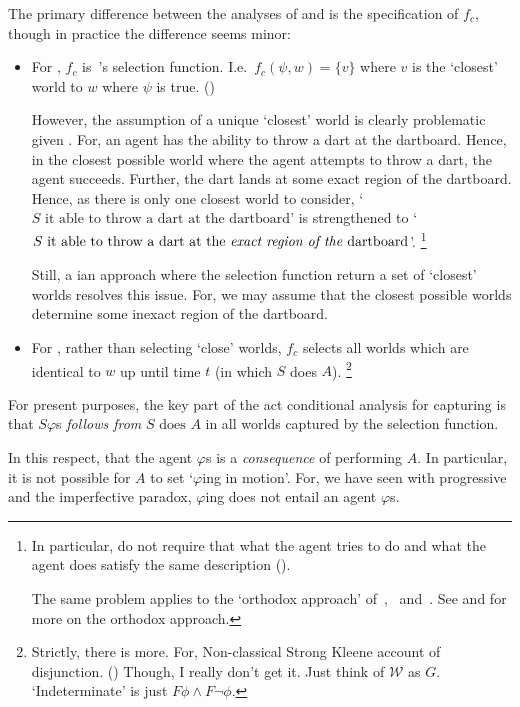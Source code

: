 \begin{note}
  The primary difference between the analyses of \citeauthor{Mandelkern:2017aa} and \citeauthor{Boylan:2020aa} is the specification of \(f_{c}\), though in practice the difference seems minor:
  \begin{itemize}
  \item
    For \citeauthor{Mandelkern:2017aa},
    \(f_{c}\) is~\citeauthor{Stalnaker:1968vt}'s selection function.
    I.e.\ \(f_{c}(\psi, w) = \{v\}\) where \(v\) is the `closest' world to \(w\) where \(\psi\) is true.
    (\citeyear[Cf.][314]{Mandelkern:2017aa})

    However, the assumption of a unique `closest' world is clearly problematic given \BoyVS{}.
    For, an agent has the ability to throw a dart at the dartboard.
    Hence, in the closest possible world where the agent attempts to throw a dart, the agent succeeds.
    Further, the dart lands at some exact region of the dartboard.
    Hence, as there is only one closest world to consider, `\(S\text{ it able to throw a dart at the dartboard}\)' is strengthened to `\(S\text{ it able to throw a dart at the \emph{exact region of the} dartboard}\)'.%
    \footnote{
      In particular, \citeauthor{Mandelkern:2017aa} do not require that what the agent tries to do and what the agent does satisfy the same description (\citeyear[310,314]{Mandelkern:2017aa}).

      The same problem applies to the `orthodox approach' of~\textcite{Hilpinen:1969vw}, \textcite{Kratzer:1977aa,Kratzer:1981vn}~and~\textcite{Lewis:1976us}.
      See \textcite[\S1.3]{Boylan:2020aa} and \textcite[\S2]{Mandelkern:2017aa} for more on the orthodox approach.
    }

    Still, a \citeauthor{Lewis:1973th}ian approach where the selection function return a set of `closest' worlds resolves this issue.
    For, we may assume that the closest possible worlds determine some inexact region of the dartboard.
  \item
    For \citeauthor{Boylan:2020aa}, rather than selecting `close' worlds, \(f_{c}\) selects all worlds which are identical to \(w\) up until time \(t\) (in which \(S\) does \(A\)).%
    \footnote{
      Strictly, there is more.
      For, Non-classical Strong Kleene account of disjunction.
      (\citeyear[\S5]{Boylan:2020aa})
      Though, I really don't get it.
      Just think of \(\mathcal{W}\) as \(G\).
      `Indeterminate' is just \(F \phi \land F \lnot \phi\).
    }
  \end{itemize}

  For present purposes, the key part of the act conditional analysis for capturing \AbControl{} is that \(S \varphi\)s \emph{follows from} \(S\text{ does }A\) in all worlds captured by the selection function.

  In this respect, that the agent \(\varphi\)s is a \emph{consequence} of performing \(A\).
  In particular, it is not possible for \(A\) to set `\(\varphi\)ing in motion'.
  For, we have seen with progressive and the imperfective paradox, \(\varphi\)ing does not entail an agent \(\varphi\)s.
\end{note}

